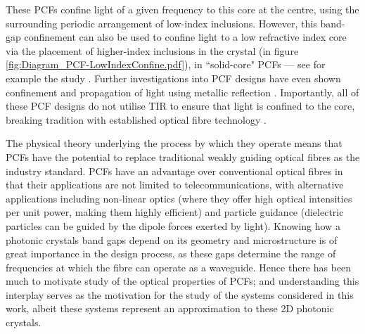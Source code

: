 These PCFs confine light of a given frequency to this core at the centre, using the surrounding periodic arrangement of low-index inclusions.
However, this band-gap confinement can also be used to confine light to a low refractive index core via the placement of higher-index inclusions in the crystal (in figure \ref{fig:Diagram_PCF-LowIndexConfine.pdf}), in ``solid-core" PCFs --- see for example the study \cite{luan2004allsolid}.
Further investigations into PCF designs have even shown confinement and propagation of light using metallic reflection \cite{hou2008metallic}.
Importantly, all of these PCF designs do not utilise TIR to ensure that light is confined to the core, breaking tradition with established optical fibre technology \cite{knight2003photonic, russell2003photonic}.

The physical theory underlying the process by which they operate means that PCFs have the potential to replace traditional weakly guiding optical fibres as the industry standard.
PCFs have an advantage over conventional optical fibres in that their applications are not limited to telecommunications, with alternative applications including non-linear optics (where they offer high optical intensities per unit power, making them highly efficient) and particle guidance (dielectric particles can be guided by the dipole forces exerted by light).
Knowing how a photonic crystals band gaps depend on its geometry and microstructure is of great importance in the design process, as these gaps determine the range of frequencies at which the fibre can operate as a waveguide.
Hence there has been much to motivate study of the optical properties of PCFs; and understanding this interplay serves as the motivation for the study of the systems considered in this work, albeit these systems represent an approximation to these 2D photonic crystals.

